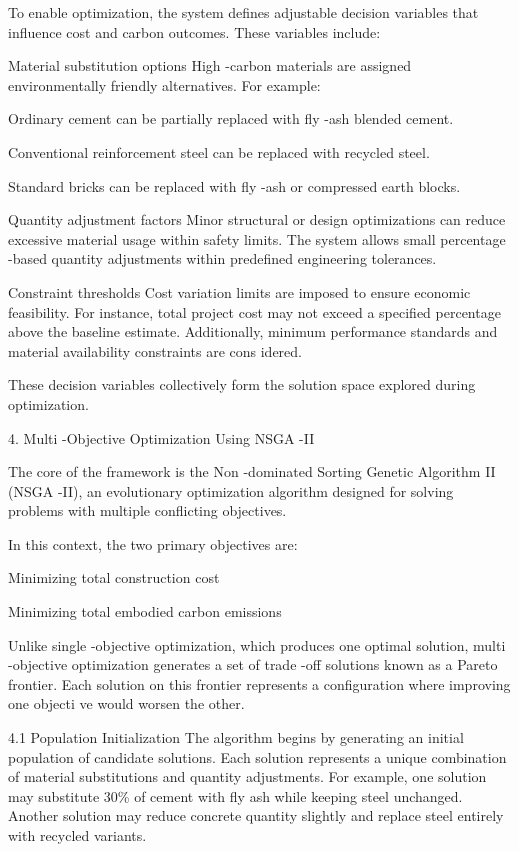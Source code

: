 \documentclass[10pt,twocolumn]{article}
\begin{document}
To enable optimization, the system defines adjustable decision variables that influence cost and 
carbon outcomes. These variables include:  
 
Material substitution options  
High -carbon materials are assigned environmentally friendly alternatives. For example:  
 
Ordinary cement can be partially replaced with fly -ash blended cement.  
 
Conventional reinforcement steel can be replaced with recycled steel.  
 
Standard bricks can be replaced with fly -ash or compressed earth blocks.  
 
Quantity adjustment factors  
Minor structural or design optimizations can reduce excessive material usage within safety limits. The 
system allows small percentage -based quantity adjustments within predefined engineering 
tolerances.  
 
Constraint thresholds  
Cost variation limits are imposed to ensure economic feasibility. For instance, total project cost may 
not exceed a specified percentage above the baseline estimate. Additionally, minimum performance 
standards and material availability constraints are cons idered.  
 
These decision variables collectively form the solution space explored during optimization.  
 
4. Multi -Objective Optimization Using NSGA -II 
 
The core of the framework is the Non -dominated Sorting Genetic Algorithm II (NSGA -II), an 
evolutionary optimization algorithm designed for solving problems with multiple conflicting 
objectives.  
 
In this context, the two primary objectives are:  
 
Minimizing total construction cost  
 
Minimizing total embodied carbon emissions  
 
Unlike single -objective optimization, which produces one optimal solution, multi -objective 
optimization generates a set of trade -off solutions known as a Pareto frontier. Each solution on this 
frontier represents a configuration where improving one objecti ve would worsen the other.  
 
4.1 Population Initialization  
The algorithm begins by generating an initial population of candidate solutions. Each solution 
represents a unique combination of material substitutions and quantity adjustments.  
For example, one solution may substitute 30\% of cement with fly ash while keeping steel unchanged. 
Another solution may reduce concrete quantity slightly and replace steel entirely with recycled 
variants.  
 
\end{document}

